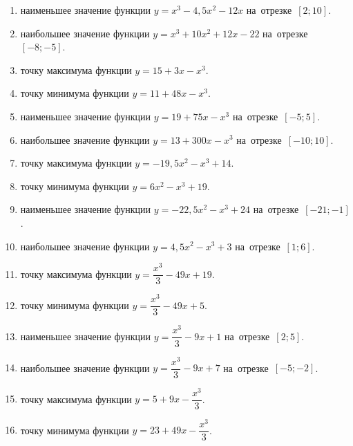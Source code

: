 \documentclass[a4paper,10pt]{article}
\begin{document}
\begin{enumerate}
\item {} наименьшее значение функции $y=x^3 -4,5x^2-12x$ на~отрезке~$\left[2;10\right]$.

\item {} наибольшее значение функции $y=x^3 +10x^2+12x-22$ на~отрезке~$\left[-8;-5\right]$.

\item {} точку максимума функции $y=15+3x-x^3$.

\item {} точку минимума функции $y=11+48x-x^3$.

\item {} наименьшее значение функции $y=19+75x-x^3$ на~отрезке~$\left[-5;5\right]$.

\item {} наибольшее значение функции $y=13+300x-x^3$ на~отрезке~$\left[-10;10\right]$.

\item {} точку максимума функции $y=-19,5x^2-x^3+14$.

\item {} точку минимума функции $y=6x^2-x^3+19$.

\item {} наименьшее значение функции $y=-22,5x^2-x^3+24$ на~отрезке~$\left[-21;-1\right]$.

\item {} наибольшее значение функции $y=4,5x^2-x^3+3$ на~отрезке~$\left[1;6\right]$.

\item {} точку максимума функции $y=\dfrac{x^3}{3} -49x+19$.

\item {} точку минимума функции $y=\dfrac{x^3}{3} -49x+5$.

\item {} наименьшее значение функции $y=\dfrac{x^3}{3} -9x+1$ на~отрезке~$\left[2;5\right]$.

\item {} наибольшее значение функции $y=\dfrac{x^3}{3} -9x+7$ на~отрезке~$\left[-5;-2\right]$.

\item {} точку максимума функции $y=5 +9x-\dfrac{x^3}{3}$.

\item {} точку минимума функции $y=23 +49x-\dfrac{x^3}{3}$.


\end{enumerate}
\end{document}
